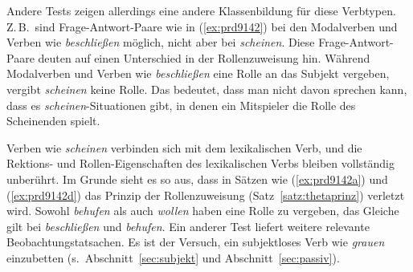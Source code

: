 Andere Tests zeigen allerdings eine andere Klassenbildung für diese Verbtypen.
Z.\,B.\ sind Frage-Antwort-Paare wie in (\ref{ex:prd9142}) bei den Modalverben und Verben wie \textit{beschließen} möglich, nicht aber bei \textit{scheinen}.
Diese Frage-Antwort-Paare deuten auf einen Unterschied in der Rollenzuweisung hin.
Während Modalverben und Verben wie \textit{beschließen} eine Rolle an das Subjekt vergeben, vergibt \textit{scheinen} keine Rolle.
Das bedeutet, dass man nicht davon sprechen kann, dass es \textit{scheinen}-Situationen gibt, in denen ein Mitspieler die Rolle des Scheinenden spielt.

\begin{exe}
  \ex\label{ex:prd9142} 
  \begin{xlist}
  \end{xlist}
\end{exe}

Verben wie \textit{scheinen} verbinden sich mit dem lexikalischen Verb, und die Rek\-tions- und Rollen-Eigenschaften des lexikalischen Verbs bleiben vollständig unberührt.
Im Grunde sieht es so aus, dass in Sätzen wie (\ref{ex:prd9142a}) und (\ref{ex:prd9142d}) das Prinzip der Rollenzuweisung (Satz~\ref{satz:thetaprinz}) verletzt wird.
Sowohl \textit{behufen} als auch \textit{wollen} haben eine Rolle zu vergeben, das Gleiche gilt bei \textit{beschließen} und \textit{behufen}.
Ein anderer Test liefert weitere relevante Beobachtungstatsachen.
Es ist der Versuch, ein subjektloses Verb wie \textit{grauen} einzubetten (s.\ Abschnitt~\ref{sec:subjekt} und Abschnitt~\ref{sec:passiv}).

\begin{exe}
  \ex\label{ex:prd9143}
  \begin{xlist}
  \end{xlist}
\end{exe}

